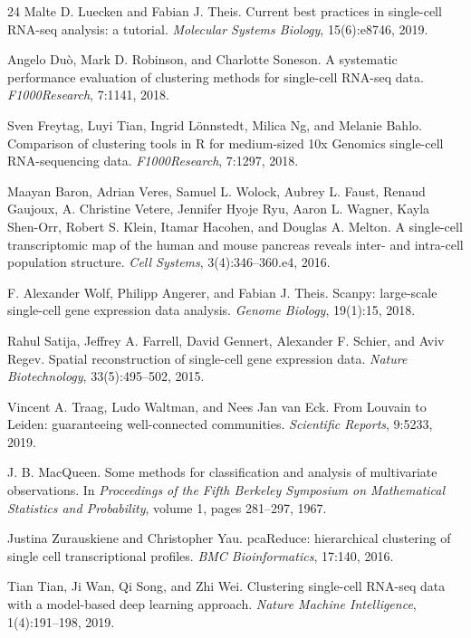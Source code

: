 \documentclass[11pt,a4paper]{article}
\begin{document}
\begin{thebibliography}{24}
Malte D. Luecken and Fabian J. Theis.
\newblock Current best practices in single-cell RNA-seq analysis: a tutorial.
\newblock \textit{Molecular Systems Biology}, 15(6):e8746, 2019.

Angelo Duò, Mark D. Robinson, and Charlotte Soneson.
\newblock A systematic performance evaluation of clustering methods for single-cell RNA-seq data.
\newblock \textit{F1000Research}, 7:1141, 2018.

Sven Freytag, Luyi Tian, Ingrid L\"onnstedt, Milica Ng, and Melanie Bahlo.
\newblock Comparison of clustering tools in R for medium-sized 10x Genomics single-cell RNA-sequencing data.
\newblock \textit{F1000Research}, 7:1297, 2018.

Maayan Baron, Adrian Veres, Samuel L. Wolock, Aubrey L. Faust, Renaud Gaujoux, A. Christine Vetere, Jennifer Hyoje Ryu, Aaron L. Wagner, Kayla Shen-Orr, Robert S. Klein, Itamar Hacohen, and Douglas A. Melton.
\newblock A single-cell transcriptomic map of the human and mouse pancreas reveals inter- and intra-cell population structure.
\newblock \textit{Cell Systems}, 3(4):346--360.e4, 2016.

F. Alexander Wolf, Philipp Angerer, and Fabian J. Theis.
\newblock Scanpy: large-scale single-cell gene expression data analysis.
\newblock \textit{Genome Biology}, 19(1):15, 2018.

Rahul Satija, Jeffrey A. Farrell, David Gennert, Alexander F. Schier, and Aviv Regev.
\newblock Spatial reconstruction of single-cell gene expression data.
\newblock \textit{Nature Biotechnology}, 33(5):495--502, 2015.

Vincent A. Traag, Ludo Waltman, and Nees Jan van Eck.
\newblock From Louvain to Leiden: guaranteeing well-connected communities.
\newblock \textit{Scientific Reports}, 9:5233, 2019.

J. B. MacQueen.
\newblock Some methods for classification and analysis of multivariate observations.
\newblock In \textit{Proceedings of the Fifth Berkeley Symposium on Mathematical Statistics and Probability}, volume 1, pages 281--297, 1967.

Justina Zurauskiene and Christopher Yau.
\newblock pcaReduce: hierarchical clustering of single cell transcriptional profiles.
\newblock \textit{BMC Bioinformatics}, 17:140, 2016.

Tian Tian, Ji Wan, Qi Song, and Zhi Wei.
\newblock Clustering single-cell RNA-seq data with a model-based deep learning approach.
\newblock \textit{Nature Machine Intelligence}, 1(4):191--198, 2019.


\end{thebibliography}
\end{document}

